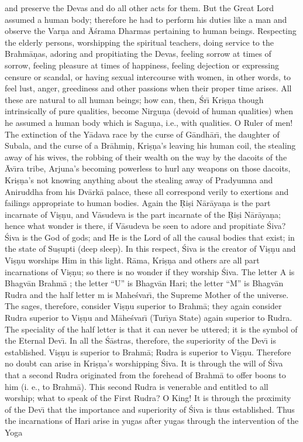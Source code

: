 and preserve the Devas and do all other acts for them. But the Great Lord assumed a human body; therefore he had to perform his duties like a man and observe the Var\d{n}a and \=A\'srama Dharmas pertaining to human beings. Respecting the elderly persons, worshipping the spiritual teachers, doing service to the Brahm\=a\d{n}as, adoring and propitiating the Devas, feeling sorrow at times of sorrow, feeling pleasure at times of happiness, feeling dejection or expressing censure or scandal, or having sexual intercourse with women, in other words, to feel lust, anger, greediness and other passions when their proper time arises. All these are natural to all human beings; how can, then, \'Sr\={\i} Kri\d{s}\d{n}a though intrinsically of pure qualities, become Nirgu\d{n}a (devoid of human qualities) when he assumed a human body which is Sagu\d{n}a, i.e., with qualities. O Ruler of men! The extinction of the Y\=adava race by the curse of G\=andh\=ar\={\i}, the daughter of Subala, and the curse of a Br\=ahmi\d{n}, Kri\d{s}\d{n}a's leaving his human coil, the stealing away of his wives, the robbing of their wealth on the way by the dacoits of the \=Av\={\i}ra tribe, Arjuna's becoming powerless to hurl any weapons on those dacoits, Kri\d{s}\d{n}a's not knowing anything about the stealing away of Pradyumna and Aniruddha from his Dv\=ark\=a palace, these all correspond verily to exertions and failings appropriate to human bodies. Again the \d{R}i\d{s}i N\=ar\=aya\d{n}a is the part incarnate of Vi\d{s}\d{n}u, and V\=asudeva is the part incarnate of the \d{R}i\d{s}i N\=ar\=aya\d{n}a; hence what wonder is there, if V\=asudeva be seen to adore and propitiate \'Siva? \'Siva is the God of gods; and He is the Lord of all the causal bodies that exist; in the state of Su\d{s}upti (deep sleep). In this respect, \'Siva is the creator of Vi\d{s}\d{n}u and Vi\d{s}\d{n}u worships Him in this light. R\=ama, Kri\d{s}\d{n}a and others are all part incarnations of Vi\d{s}\d{n}u; so there is no wonder if they worship \'Siva. The letter A is Bhagv\=an Brahm\=a ; the letter ``U'' is Bhagv\=an Hari; the letter ``M'' is Bhagv\=an Rudra and the half letter m is Mahe\'svar\={\i}, the Supreme Mother of the universe. The sages, therefore, consider Vi\d{s}\d{n}u superior to Brahm\=a; they again consider Rudra superior to Vi\d{s}\d{n}u and M\=ahe\'svar\={\i} (Tur\={\i}ya State) again superior to Rudra. The speciality of the half letter is that it can never be uttered; it is the symbol of the Eternal Dev\={\i}. In all the \'S\=astras, therefore, the superiority of the Dev\={\i} is established. Vi\d{s}\d{n}u is superior to Brahm\=a; Rudra is superior to Vi\d{s}\d{n}u. Therefore no doubt can arise in Kri\d{s}\d{n}a's worshipping \'Siva. It is through the will of \'Siva that a second Rudra originated from the forehead of Brahm\=a to offer boons to him (i. e., to Brahm\=a). This second Rudra is venerable and entitled to all worship; what to speak of the First Rudra? O King! It is through the proximity of the Dev\={\i} that the importance and superiority of \'Siva is thus established. Thus the incarnations of Hari arise in yugas after yugas through the intervention of the Yoga

